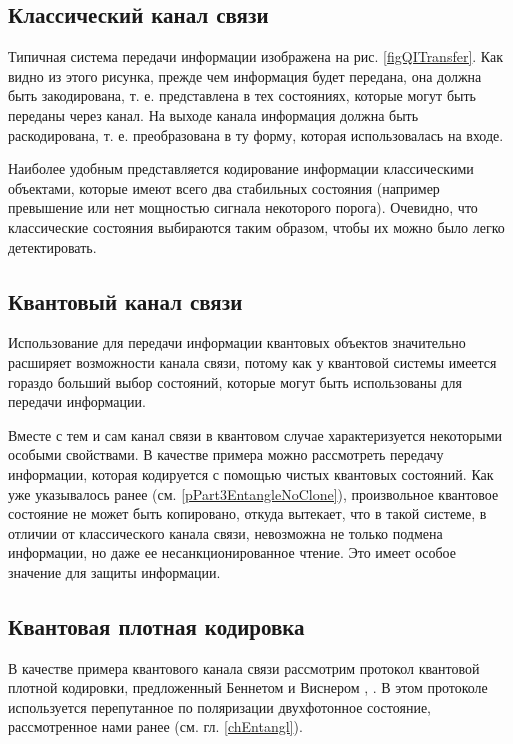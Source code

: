 \subsection{Классический канал связи}

Типичная система передачи информации изображена на
рис. \ref{figQITransfer}. Как видно из этого рисунка, прежде чем
информация будет передана, она должна быть закодирована,
т. е. представлена в тех состояниях, которые могут быть переданы через
канал. На выходе канала информация должна быть раскодирована,
т. е. преобразована в ту форму, которая использовалась на входе. 

Наиболее удобным представляется кодирование информации классическими
объектами, которые имеют всего два стабильных состояния (например
превышение или нет мощностью сигнала некоторого порога). Очевидно, что
классические состояния выбираются таким образом, чтобы их можно было
легко детектировать. 

\subsection{Квантовый канал связи}

Использование для передачи информации квантовых объектов значительно
расширяет возможности канала связи, потому как у квантовой системы
имеется гораздо больший выбор состояний, которые могут быть использованы для
передачи информации.

Вместе с тем и сам канал связи в квантовом случае характеризуется
некоторыми особыми свойствами. В качестве примера можно рассмотреть
передачу информации, которая кодируется с помощью чистых квантовых
состояний. Как уже указывалось ранее (см. \ref{pPart3EntangleNoClone}),
произвольное квантовое состояние не может быть копировано, откуда
вытекает, что в такой системе, в отличии от классического канала связи,
невозможна не только подмена информации, но даже ее
несанкционированное чтение. Это имеет особое значение для защиты
информации. 

\subsection{Квантовая плотная кодировка}
\label{subsecPart3QuantInfoBigCoding}
В качестве примера квантового канала связи рассмотрим протокол
квантовой плотной кодировки, предложенный Беннетом и Виснером
\cite{bBennettWiesner}, \cite{bDenseCodeExp}. В этом протоколе
используется перепутанное по поляризации двухфотонное состояние,
рассмотренное нами ранее  (см. гл. \ref{chEntangl}).  

